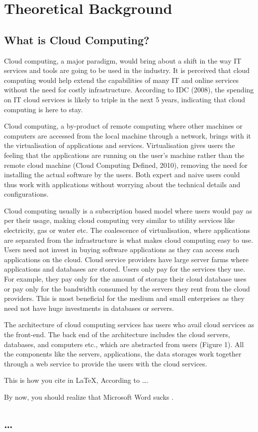 \chapter{Theoretical Background}



\section{What is Cloud Computing?}
 Cloud computing, a major paradigm, would bring
about a shift in the way IT services and tools are going to be used in the
industry. It is perceived that cloud computing would help extend the
capabilities of many IT and online services without the need for costly
infrastructure. According to IDC (2008), the spending on IT cloud services is
likely to triple in the next 5 years, indicating that cloud computing is here to
stay.

Cloud computing, a by-product of remote computing where other machines or
computers are accessed from the local machine through a network, brings with it
the virtualisation of applications and services. Virtualisation gives users the
feeling that the applications are running on the user's machine rather than the
remote cloud machine (Cloud Computing Defined, 2010), removing the need for
installing the actual software by the users. Both expert and naive users could
thus work with applications without worrying about the technical details and
configurations.

Cloud computing usually is a subscription based model where users would pay as
per their usage, making cloud computing very similar to utility services like
electricity, gas or water etc. The coalescence of virtualisation, where
applications are separated from the infrastructure is what makes cloud computing
easy to use. Users need not invest in buying software applications as they can
access such applications on the cloud. Cloud service providers have large server
farms where applications and databases are stored. Users only pay for the
services they use. For example, they pay only for the amount of storage their
cloud database uses or pay only for the bandwidth consumed by the servers they
rent from the cloud providers. This is most beneficial for the medium and small
enterprises as they need not have huge investments in databases or servers.

The architecture of cloud computing services has users who avail cloud services
as the front-end. The back end of the architecture includes the cloud servers,
databases, and computers etc., which are abstracted from users (Figure 1). All
the components like the servers, applications, the data storages work together
through a web service to provide the users with the cloud services.


	This is how you cite in \LaTeX, 
	According to \citet{pso:rapso:rada-vilela11}\ldots.
	
	By now, you should realize that Microsoft Word sucks
	\citep{pso:spso-apso:rada-vilela11}.
	
	

\section{\ldots}

\blindtext